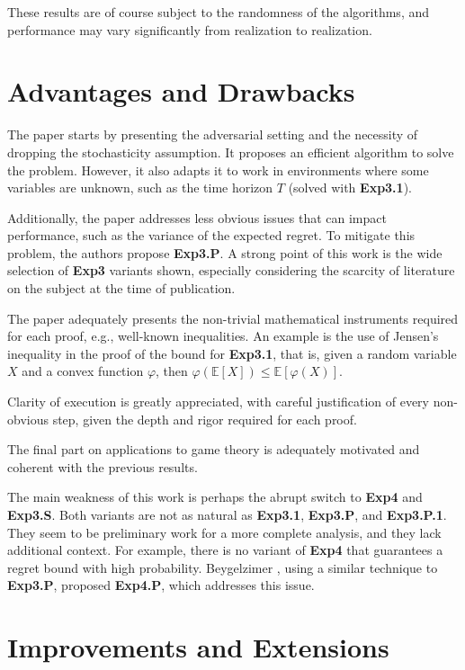 \documentclass[12pt,a4paper]{article}
\begin{document}
These results are of course subject to the randomness of the algorithms, and performance may vary significantly from realization to realization.

\section{Advantages and Drawbacks}

The paper starts by presenting the adversarial setting and the necessity of dropping the stochasticity assumption.  It proposes an efficient algorithm to solve the problem. However, it also adapts it to work in environments where some variables are unknown, such as the time horizon $T$ (solved with \textbf{Exp3.1}).

Additionally, the paper addresses less obvious issues that can impact performance, such as the variance of the expected regret. To mitigate this problem, the authors propose \textbf{Exp3.P}.  A strong point of this work is the wide selection of \textbf{Exp3} variants shown, especially considering the scarcity of literature on the subject at the time of publication.

The paper adequately presents the non-trivial mathematical instruments required for each proof, e.g., well-known inequalities. An example is the use of Jensen's inequality in the proof of the bound for \textbf{Exp3.1}, that is, given a random variable $X$ and a convex function $\varphi$, then $\varphi(\mathbb{E}[X]) \leq \mathbb{E}[\varphi(X)]$.


Clarity of execution is greatly appreciated, with careful justification of every non-obvious step, given the depth and rigor required for each proof.

The final part on applications to game theory is adequately motivated and coherent with the previous results.

The main weakness of this work is perhaps the abrupt switch to \textbf{Exp4} and \textbf{Exp3.S}. Both variants are not as natural as \textbf{Exp3.1}, \textbf{Exp3.P}, and \textbf{Exp3.P.1}. They seem to be preliminary work for a more complete analysis, and they lack additional context. For example, there is no variant of \textbf{Exp4} that guarantees a regret bound with high probability. Beygelzimer \cite{pmlr-v15-beygelzimer11a}, using a similar technique to \textbf{Exp3.P}, proposed \textbf{Exp4.P}, which addresses this issue. 

\section{Improvements and Extensions}
\end{document}
